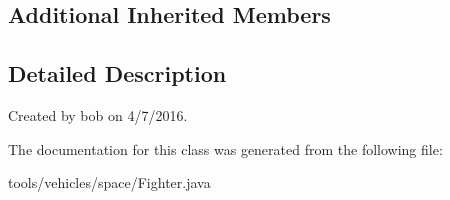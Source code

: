 \subsection*{Additional Inherited Members}


\subsection{Detailed Description}
Created by bob on 4/7/2016. 

The documentation for this class was generated from the following file\+:\begin{DoxyCompactItemize}
\item 
tools/vehicles/space/Fighter.\+java\end{DoxyCompactItemize}
